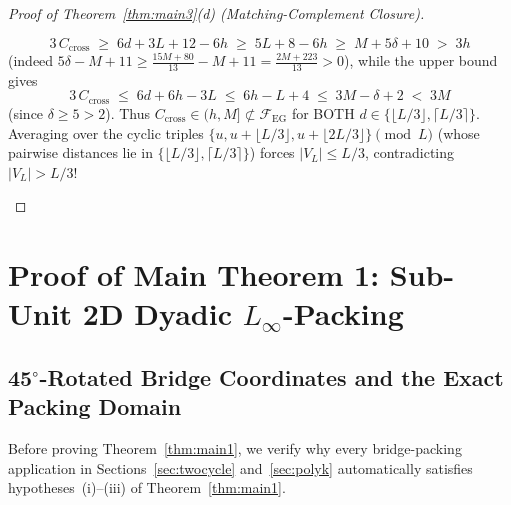 \documentclass[11pt,reqno]{amsart}
\theoremstyle{plain}
\theoremstyle{definition}
\theoremstyle{remark}
\newcommand{\FEG}{\mathcal{F}_{\mathrm{EG}}}
\DeclareRobustCommand{\_}{\ifmmode\text{\textunderscore}\else\textunderscore\allowbreak\fi}
\begin{document}
\begin{proof}[Proof of Theorem~\ref{thm:main3}(d) (Matching-Complement Closure)]
\begin{itemize}[leftmargin=1.6em]
  \[
    3\, C_{\mathrm{cross}} \;\ge\; 6d + 3L + 12 - 6h \;\ge\; 5L + 8 - 6h \;\ge\; M + 5\delta + 10 \;>\; 3h
  \]
  (indeed $5\delta - M + 11 \ge \frac{15M + 80}{13} - M + 11 = \frac{2M + 223}{13} > 0$), while the upper bound gives
  \[
    3\, C_{\mathrm{cross}} \;\le\; 6d + 6h - 3L \;\le\; 6h - L + 4 \;\le\; 3M - \delta + 2 \;<\; 3M
  \]
  (since $\delta \ge 5 > 2$). Thus $C_{\mathrm{cross}} \in (h, M] \not\subset \FEG$ for BOTH $d \in \{\lfloor L/3 \rfloor, \lceil L/3 \rceil\}$. Averaging over the cyclic triples $\{u, u + \lfloor L/3 \rfloor, u + \lfloor 2L/3 \rfloor\} \pmod L$ (whose pairwise distances lie in $\{\lfloor L/3 \rfloor, \lceil L/3 \rceil\}$) forces $|V_L| \le L/3$, contradicting $|V_L| > L/3$! \qedhere
\end{itemize}
\end{proof}

\section{Proof of Main Theorem 1: Sub-Unit 2D Dyadic \texorpdfstring{$L_\infty$}{L-infinity}-Packing}\label{sec:packing}

\subsection{45\texorpdfstring{$^\circ$}{deg}-Rotated Bridge Coordinates and the Exact Packing Domain}\label{subsec:bridge-encoding}

Before proving Theorem~\ref{thm:main1}, we verify why every bridge-packing application in Sections~\ref{sec:twocycle} and~\ref{sec:polyk} automatically satisfies hypotheses~(i)--(iii) of Theorem~\ref{thm:main1}.
\end{document}
